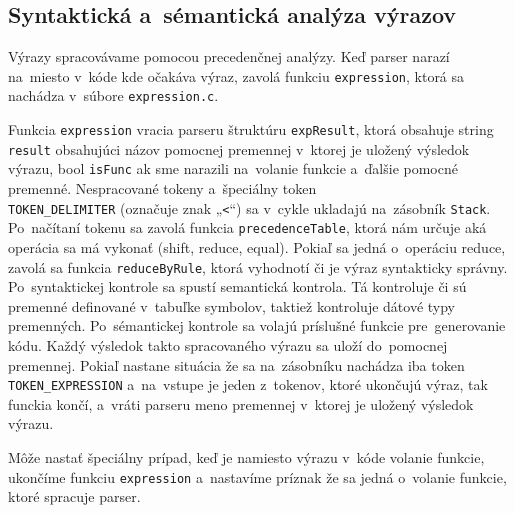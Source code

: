 \documentclass[a4paper, 12pt]{article}[25.11.2020]
\begin{document}
    \subsection{Syntaktická a~sémantická analýza výrazov}\label{expression}
        \par Výrazy spracovávame pomocou precedenčnej analýzy. Keď parser narazí na~miesto
        v~kóde kde očakáva výraz, zavolá funkciu \verb|expression|, ktorá sa nachádza v~súbore
        \verb|expression.c|.
        \par Funkcia \verb|expression| vracia parseru štruktúru \verb|expResult|, ktorá
        obsahuje string \verb|result| obsahujúci názov pomocnej premennej v~ktorej je uložený
        výsledok výrazu, bool \verb|isFunc| ak sme narazili na~volanie funkcie a~ďalšie pomocné
        premenné. Nespracované tokeny a~špeciálny token \\ \verb|TOKEN_DELIMITER| (označuje
        znak „\verb|<|“) sa v~cykle ukladajú na~zásobník \verb|Stack|. Po~načítaní tokenu sa
        zavolá funkcia \verb|precedenceTable|, ktorá nám určuje aká operácia sa má vykonať
        (shift, reduce, equal). Pokiaľ sa jedná o~operáciu reduce, zavolá sa funkcia
        \verb|reduceByRule|, ktorá vyhodnotí či je výraz syntakticky správny. Po~syntaktickej
        kontrole sa spustí semantická kontrola. Tá kontroluje či sú premenné definované
        v~tabuľke symbolov, taktiež kontroluje dátové typy premenných. Po~sémantickej kontrole
        sa volajú príslušné funkcie pre~generovanie kódu. Každý výsledok takto spracovaného
        výrazu sa uloží do~pomocnej premennej. Pokiaľ nastane situácia že sa na~zásobníku
        nachádza iba token \verb|TOKEN_EXPRESSION| a~na~vstupe je jeden z~tokenov, ktoré
        ukončujú výraz, tak funckia končí, a~vráti parseru meno premennej v~ktorej je uložený
        výsledok výrazu.
        \par Môže nastať špeciálny prípad, keď je namiesto výrazu v~kóde volanie funkcie,
        ukončíme funkciu \verb|expression| a~nastavíme príznak že sa jedná o~volanie funkcie,
        ktoré spracuje parser.
\end{document}
